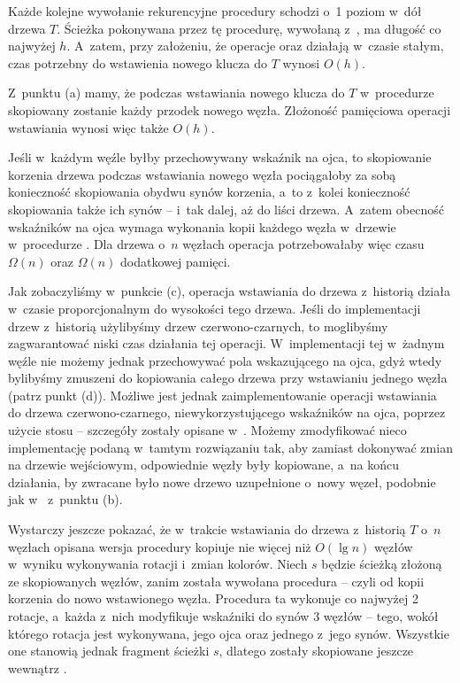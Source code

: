 \subproblem %
Każde kolejne wywołanie rekurencyjne procedury  schodzi o~1 poziom w~dół drzewa $T$.
Ścieżka pokonywana przez tę procedurę, wywołaną z~, ma długość co najwyżej $h$.
A~zatem, przy założeniu, że operacje  oraz  działają w~czasie stałym, czas potrzebny do wstawienia nowego klucza do $T$ wynosi $O(h)$.

Z~punktu (a) mamy, że podczas wstawiania nowego klucza do $T$ w~procedurze  skopiowany zostanie każdy przodek nowego węzła.
Złożoność pamięciowa operacji wstawiania wynosi więc także $O(h)$.

\subproblem %
Jeśli w~każdym węźle byłby przechowywany wskaźnik na ojca, to skopiowanie korzenia drzewa podczas wstawiania nowego węzła pociągałoby za sobą konieczność skopiowania obydwu synów korzenia, a~to z~kolei konieczność skopiowania także ich synów -- i~tak dalej, aż do liści drzewa.
A~zatem obecność wskaźników na ojca wymaga wykonania kopii każdego węzła w~drzewie w~procedurze .
Dla drzewa o~$n$ węzłach operacja  potrzebowałaby więc czasu $\Omega(n)$ oraz $\Omega(n)$ dodatkowej pamięci.

\subproblem %
Jak zobaczyliśmy w~punkcie (c), operacja wstawiania do drzewa z~historią działa w~czasie proporcjonalnym do wysokości tego drzewa.
Jeśli do implementacji drzew z~historią użylibyśmy drzew czerwono-czarnych, to moglibyśmy zagwarantować niski czas działania tej operacji.
W~implementacji tej w~żadnym węźle nie możemy jednak przechowywać pola wskazującego na ojca, gdyż wtedy bylibyśmy zmuszeni do kopiowania całego drzewa przy wstawianiu jednego węzła (patrz punkt (d)).
Możliwe jest jednak zaimplementowanie operacji wstawiania do drzewa czerwono-czarnego, niewykorzystującego wskaźników na ojca, poprzez użycie stosu -- szczegóły zostały opisane w~.
Możemy zmodyfikować nieco implementację podaną w~tamtym rozwiązaniu tak, aby zamiast dokonywać zmian na drzewie wejściowym, odpowiednie węzły były kopiowane, a~na końcu działania, by zwracane było nowe drzewo uzupełnione o~nowy węzeł, podobnie jak w~ z~punktu (b).

Wystarczy jeszcze pokazać, że w~trakcie wstawiania do drzewa z~historią $T$ o~$n$ węzłach opisana wersja procedury  kopiuje nie więcej niż $O(\lg n)$ węzłów w~wyniku wykonywania rotacji i~zmian kolorów.
Niech $s$ będzie ścieżką złożoną ze skopiowanych węzłów, zanim została wywołana procedura  -- czyli od kopii korzenia do nowo wstawionego węzła.
Procedura ta wykonuje co najwyżej 2 rotacje, a~każda z~nich modyfikuje wskaźniki do synów 3 węzłów -- tego, wokół którego rotacja jest wykonywana, jego ojca oraz jednego z~jego synów.
Wszystkie one stanowią jednak fragment ścieżki $s$, dlatego zostały skopiowane jeszcze wewnątrz .

